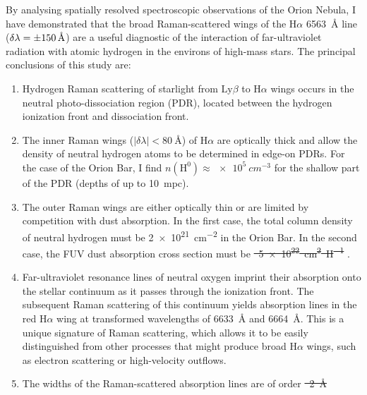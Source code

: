 \documentclass[useAMS, usenatbib, a4paper]{mnras}
\newcommand*\chem[1]{\ensuremath{\mathrm{#1}}}
\newcommand\ha{\ensuremath{\text{H}\alpha}}
\newcommand\lyb{\ensuremath{\text{Ly}\beta}}
\providecommand{\DIFaddtex}[1]{{\protect\color{red!70!black}\uwave{#1}}} %
\providecommand{\DIFdeltex}[1]{{\protect\color{white!50!black} \ifmmode\cancel{#1}\else\sout{#1}\fi}} %
\providecommand{\DIFaddbegin}{} %
\providecommand{\DIFaddend}{} %
\providecommand{\DIFdelbegin}{} %
\providecommand{\DIFdelend}{} %
\providecommand{\DIFadd}[1]{\texorpdfstring{\DIFaddtex{#1}}{#1}} %
\providecommand{\DIFdel}[1]{\texorpdfstring{\DIFdeltex{#1}}{}} %
\begin{document}
By analysing spatially resolved spectroscopic observations  of the Orion Nebula,
I have demonstrated that the broad Raman-scattered wings
of the \ha{} \SI{6563}{\angstrom} line
(\(\delta \lambda = \SI{\pm 150}{\angstrom}\))
are a useful diagnostic of the interaction of far-ultraviolet radiation with
atomic hydrogen in the environs of high-mass stars.
The principal conclusions of this study are:
\begin{enumerate}[1.]
\item Hydrogen Raman scattering of starlight from \lyb{} to \ha{} wings
  occurs in the neutral photo-dissociation region (PDR),
  located between the hydrogen ionization front and dissociation front.  
\item The inner Raman wings (\(|\delta \lambda | < \SI{80}{\angstrom}\)) of \ha{}
  are optically thick and allow
  the density of neutral hydrogen atoms to be determined in edge-on PDRs.
  For the case of the Orion Bar, I find \(n(\chem{H^0}) \approx \SI{e5}{cm^{-3}}\)
  for the shallow part of the PDR (depths of up to \SI{10}{mpc}).
\item The outer Raman wings are either optically thin or are limited by
  competition with dust absorption.
  In the first case, the total column density of neutral hydrogen must be 
  \SI{2e21}{cm^{-2}} in the Orion Bar.
  In the second case, the FUV dust absorption cross section must be
  \DIFdelbegin \DIFdel{\mbox{%
\SI{5e22}{cm^{2}.H^{-1}}}\hspace{0pt}%
}\DIFdelend \DIFaddbegin \DIFadd{\mbox{%
\SI{5e-22}{cm^{2}.H^{-1}}}\hspace{0pt}%
}\DIFaddend .
\item Far-ultraviolet resonance lines of neutral oxygen imprint their absorption
  onto the stellar continuum as it passes through the ionization front.
  The subsequent Raman scattering of this continuum yields absorption lines
  in the red \ha{} wing
  at transformed wavelengths of \SI{6633}{\angstrom} and \SI{6664}{\angstrom}.
  This is a unique signature of Raman scattering, which allows it
  to be easily distinguished from other processes that might produce broad \ha{} wings,
  such as electron scattering or high-velocity outflows.
\item
  The widths of the Raman-scattered absorption lines are of order \DIFdelbegin \DIFdel{\mbox{%
\SI{2}{\AA}}\hspace{0pt}%
}\DIFdelend \DIFaddbegin \DIFadd{\mbox{%
\SI{2}{\angstrom}}\hspace{0pt}%
}
\end{enumerate}
\end{document}
